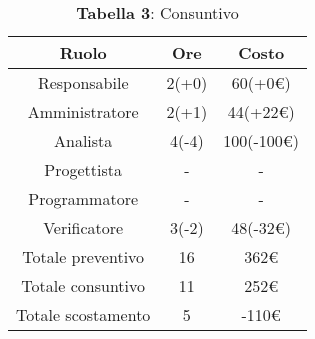 \begin{table}[H]
	\centering
	\renewcommand{\arraystretch}{1.5}
	\begin{tabular}{|c|c|c|}
		\hline
		\rowcolor{lighter-grayer}
		Ruolo & Ore & Costo \\ \hline
		Responsabile & 2(+0) & 60(+0\euro) \\ \hline
		Amministratore & 2(+1) & 44(+22\euro) \\ \hline
		Analista & 4(-4) & 100(-100\euro) \\ \hline
		Progettista & - & - \\ \hline
		Programmatore & - & - \\ \hline
		Verificatore & 3(-2) & 48(-32\euro) \\ \hline
		Totale preventivo & 16 & 362\euro \\ \hline
		Totale consuntivo & 11 & 252\euro \\ \hline
		Totale scostamento & 5 & -110\euro \\ \hline
	\end{tabular}
	\caption*{\textbf{Tabella 3}: Consuntivo\\}
\end{table}

